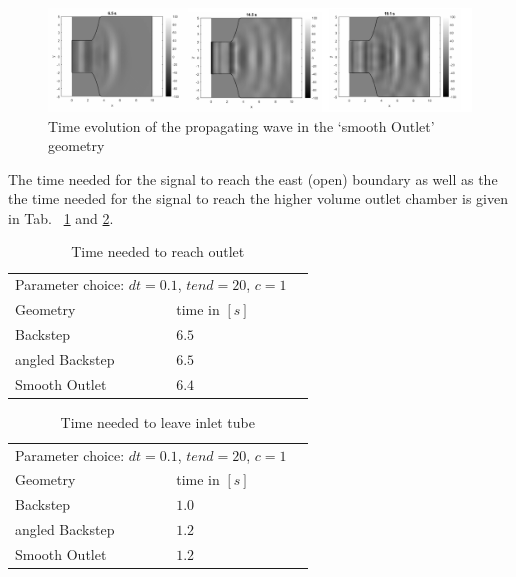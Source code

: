 \documentclass[fleqn,12pt]{NTFD} %
\begin{document}
\begin{figure}[ht]\centering %
\includegraphics[width=\linewidth]{color_smoothoutlet.png}
\caption{Time evolution of the propagating wave in the `smooth Outlet' geometry}
\label{fig:color smoothoutlet}
\end{figure}

The time needed for the signal to reach the east (open) boundary as well as the the time needed for the signal to reach the higher volume outlet chamber is given in Tab.~ \ref{tab:time outlet} and \ref{tab:time inlet}.


\begin{table}[ht!]
\caption{Time needed to reach outlet}
\centering
\begin{tabular}{llr}
\toprule
\multicolumn{2}{c}{Parameter choice: $dt = 0.1$, $tend = 20$, $c = 1$} \\
\cmidrule(r){1-2}
Geometry & time in $[s]$ \\
\midrule
Backstep & $6.5 $ \\
angled Backstep & $6.5 $ \\
Smooth Outlet & $6.4 $ \\
\bottomrule
\end{tabular}
\label{tab:time outlet}
\end{table}

\begin{table}[ht!]
\caption{Time needed to leave inlet tube}
\centering
\begin{tabular}{llr}
\toprule
\multicolumn{2}{c}{Parameter choice: $dt = 0.1$, $tend = 20$, $c = 1$} \\
\cmidrule(r){1-2}
Geometry & time in $[s]$ \\
\midrule
Backstep & $1.0 $ \\
angled Backstep & $1.2 $ \\
Smooth Outlet & $1.2 $ \\
\bottomrule
\end{tabular}
\label{tab:time inlet}
\end{table}
\end{document}
